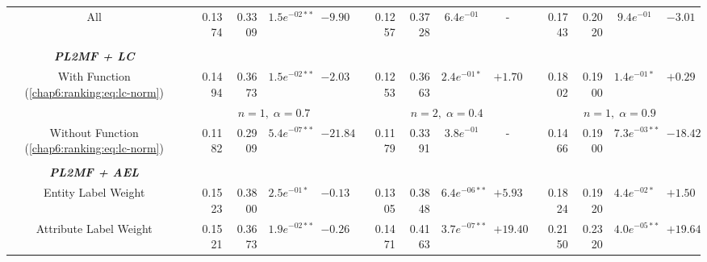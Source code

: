 \begin{table*}
{\begin{tabular}{cc@{\hs}rrccc@{\hs}rrccc@{\hs}rrcc}
{\raggedright All} & \phantom{a} & 0.1374 & 0.3309 & $1.5e^{-02**}$ & $-9.90$
                   & \phantom{a} & 0.1257 & 0.3728 & $6.4e^{-01}$ & -
                   & \phantom{a} & 0.1743 & 0.2020 & $9.4e^{-01}$ & $-3.01$
       \\
\\
\emph{\textbf{PL2MF + LC}} & \multicolumn{15}{c}{\phantom{a}} \\
\multirow{2}{*}{{\raggedright With Function (\ref{chap6:ranking:eq:lc-norm})}} & \phantom{a} & 0.1494 & 0.3673 & $1.5e^{-02**}$ & $-2.03$
                                                & \phantom{a} & 0.1253 & 0.3663 & $2.4e^{-01*}$ & $+1.70$
                                                & \phantom{a} & 0.1802 & 0.1900 & $1.4e^{-01*}$ & $+0.29$ \\%
 & \phantom{a} & \multicolumn{4}{c}{$n=1,\;\alpha=0.7$}
   & \phantom{a} & \multicolumn{4}{c}{$n=2,\;\alpha=0.4$}
   & \phantom{a} & \multicolumn{4}{c}{$n=1,\;\alpha=0.9$} \\
{\raggedright Without Function (\ref{chap6:ranking:eq:lc-norm})} & \phantom{a} & 0.1182 & 0.2909 & $5.4e^{-07**}$ & $-21.84$
                                                   & \phantom{a} & 0.1179 & 0.3391 & $3.8e^{-01}$ & -
                                                   & \phantom{a} & 0.1466 & 0.1900 & $7.3e^{-03**}$ & $-18.42$
                                       \\
\\
\emph{\textbf{PL2MF + AEL}} & \multicolumn{15}{c}{\phantom{a}} \\
{\raggedright Entity Label Weight} & \phantom{a} & 0.1523 & 0.3800 & $2.5e^{-01*}$ & $-0.13$
                                   & \phantom{a} & 0.1305 & 0.3848 & $6.4e^{-06**}$ & $+5.93$
                                   & \phantom{a} & 0.1824 & 0.1920 & $4.4e^{-02*}$ & $+1.50$
                       \\
{\raggedright Attribute Label Weight} & \phantom{a} & 0.1521 & 0.3673 & $1.9e^{-02**}$ & $-0.26$
                                      & \phantom{a} & 0.1471 & 0.4163 & $3.7e^{-07**}$ & $+19.40$
                                      & \phantom{a} & 0.2150 & 0.2320 & $4.0e^{-05**}$ & $+19.64$

\end{tabular}}
\end{table*}
